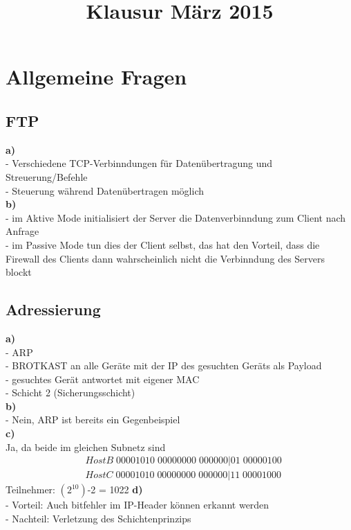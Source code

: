 \documentclass{article}
\title{Klausur M\"arz 2015}
\begin{document}
	\maketitle
	\section{Allgemeine Fragen}
		\subsection{FTP}
			\textbf{a)}\\
				- Verschiedene TCP-Verbinndungen f\"ur Daten\"ubertragung und Streuerung/Befehle\\
				- Steuerung w\"ahrend Daten\"ubertragen m\"oglich\\
			\textbf{b)}\\
				- im Aktive Mode initialisiert der Server die Datenverbinndung zum Client nach Anfrage\\
				- im Passive Mode tun dies der Client selbst, das hat den Vorteil, dass die Firewall des Clients dann wahrscheinlich nicht die Verbinndung des Servers blockt\\
		\subsection{Adressierung}
			\textbf{a)}\\
				- ARP \\
				- BROTKAST an alle Ger\"ate mit der IP des gesuchten Ger\"ats als Payload\\
				- gesuchtes Ger\"at antwortet mit eigener MAC\\
				- Schicht 2 (Sicherungsschicht)\\
			\textbf{b)}\\
				- Nein, ARP ist bereits ein Gegenbeispiel\\
			\textbf{c)}\\
				Ja, da beide im gleichen Subnetz sind
				\begin{align*}
					&HostB\;00001010\;00000000\;000000|01\;00000100 \\
					&HostC\;00001010\;00000000\;000000|11\;00001000
				\end{align*}
				Teilnehmer: $(2^10)$-2 = 1022
			\textbf{d)}\\
				- Vorteil: Auch bitfehler im IP-Header k\"onnen erkannt werden\\
				- Nachteil: Verletzung des Schichtenprinzips
\end{document}
